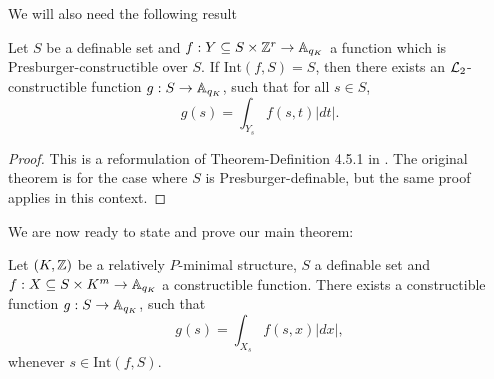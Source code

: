 We will also need the following result
\begin{thm}\label{thm:presburger-int}
Let $S$ be a definable set and $f: Y \subseteq S \times \ZZ^r \to \AA_{q_K}$ a function which is Presburger-constructible over $S$. If $\text{Int}(f,S) =S$, then there exists an $\Lm_2$-constructible function $g:S \to \AA_{q_K}$, such that for all $s \in S$,
\[ g(s) = \int_{Y_s} f(s,t)|dt|.\]  
\end{thm}
\begin{proof}
This is a reformulation of Theorem-Definition 4.5.1 in \cite{clu-loe-08}. The original theorem is for the case where $S$ is Presburger-definable, but the same proof applies in this context.
\end{proof}
We are now ready to state and prove our main theorem:
\begin{thm}\label{thm:integration}
Let $(K, \Z)$ be a relatively $P$-minimal structure, $S$ a definable set and $f: X \subseteq S\times K^m \to \AA_{q_K}$ a constructible function.  There exists a constructible function $g: S \to \AA_{q_K}$, such that
\[g(s) = \int_{X_s} f(s,x)|dx|,\]
whenever $s \in \text{Int}(f,S)$.
\end{thm}
